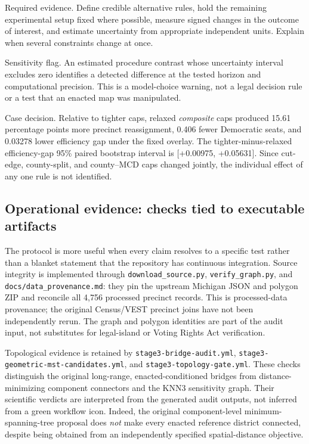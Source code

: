 \documentclass[
  10pt,
]{article}
\begin{document}
Required evidence. Define credible alternative rules, hold the remaining
experimental setup fixed where possible, measure signed changes in the
outcome of interest, and estimate uncertainty from appropriate
independent units. Explain when several constraints change at once.

Sensitivity flag. An estimated procedure contrast whose uncertainty
interval excludes zero identifies a detected difference at the tested
horizon and computational precision. This is a model-choice warning, not
a legal decision rule or a test that an enacted map was manipulated.

Case decision. Relative to tighter caps, relaxed \emph{composite} caps
produced 15.61 percentage points more precinct reassignment, 0.406 fewer
Democratic seats, and 0.03278 lower efficiency gap under the fixed
overlay. The tighter-minus-relaxed efficiency-gap 95\% paired bootstrap
interval is {[}+0.00975, +0.05631{]}. Since cut-edge, county-split, and
county--MCD caps changed jointly, the individual effect of any one rule
is not identified.

\hypertarget{operational-evidence-checks-tied-to-executable-artifacts}{%
\subsection{Operational evidence: checks tied to executable
artifacts}\label{operational-evidence-checks-tied-to-executable-artifacts}}

The protocol is more useful when every claim resolves to a specific test
rather than a blanket statement that the repository has continuous
integration. Source integrity is implemented through
\texttt{download\_source.py}, \texttt{verify\_graph.py}, and
\texttt{docs/data\_provenance.md}: they pin the upstream Michigan JSON
and polygon ZIP and reconcile all 4,756 processed precinct records. This
is processed-data provenance; the original Census/VEST precinct joins
have not been independently rerun. The graph and polygon identities are
part of the audit input, not substitutes for legal-island or Voting
Rights Act verification.

Topological evidence is retained by \texttt{stage3-bridge-audit.yml},
\texttt{stage3-geometric-mst-candidates.yml}, and
\texttt{stage3-topology-gate.yml}. These checks distinguish the original
long-range, enacted-conditioned bridges from distance-minimizing
component connectors and the KNN3 sensitivity graph. Their scientific
verdicts are interpreted from the generated audit outputs, not inferred
from a green workflow icon. Indeed, the original component-level
minimum-spanning-tree proposal does \emph{not} make every enacted
reference district connected, despite being obtained from an
independently specified spatial-distance objective.
\end{document}

